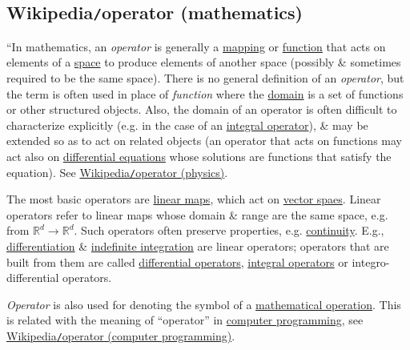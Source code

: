 \documentclass{article}
\begin{document}
\subsection{Wikipedia{\tt/}operator (mathematics)}
``In mathematics, an {\it operator} is generally a \href{https://en.wikipedia.org/wiki/Map_(mathematics)}{mapping} or \href{https://en.wikipedia.org/wiki/Function_(mathematics)}{function} that acts on elements of a \href{https://en.wikipedia.org/wiki/Space_(mathematics)}{space} to produce elements of another space (possibly \& sometimes required to be the same space). There is no general definition of an {\it operator}, but the term is often used in place of {\it function} where the \href{https://en.wikipedia.org/wiki/Domain_of_a_function}{domain} is a set of functions or other structured objects. Also, the domain of an operator is often difficult to characterize explicitly (e.g. in the case of an \href{https://en.wikipedia.org/wiki/Integral_operator}{integral operator}), \& may be extended so as to act on related objects (an operator that acts on functions may act also on \href{https://en.wikipedia.org/wiki/Differential_equation}{differential equations} whose solutions are functions that satisfy the equation). See \href{https://en.wikipedia.org/wiki/Operator_(physics)}{Wikipedia{\tt/}operator (physics)}.

The most basic operators are \href{https://en.wikipedia.org/wiki/Linear_map}{linear maps}, which act on \href{https://en.wikipedia.org/wiki/Vector_space}{vector spaes}. Linear operators refer to linear maps whose domain \& range are the same space, e.g. from $\mathbb{R}^d\to\mathbb{R}^d$. Such operators often preserve properties, e.g. \href{https://en.wikipedia.org/wiki/Continuous_function}{continuity}. E.g., \href{https://en.wikipedia.org/wiki/Differentiation_(mathematics)}{differentiation} \& \href{https://en.wikipedia.org/wiki/Indefinite_integration}{indefinite integration} are linear operators; operators that are built from them are called \href{https://en.wikipedia.org/wiki/Differential_operator}{differential operators}, \href{https://en.wikipedia.org/wiki/Integral_operator}{integral operators} or integro-differential operators.

{\it Operator} is also used for denoting the symbol of a \href{https://en.wikipedia.org/wiki/Mathematical_operation}{mathematical operation}. This is related with the meaning of ``operator'' in \href{https://en.wikipedia.org/wiki/Computer_programming}{computer programming}, see \href{https://en.wikipedia.org/wiki/Operator_(computer_programming)}{Wikipedia{\tt/}operator (computer programming)}.
\end{document}
